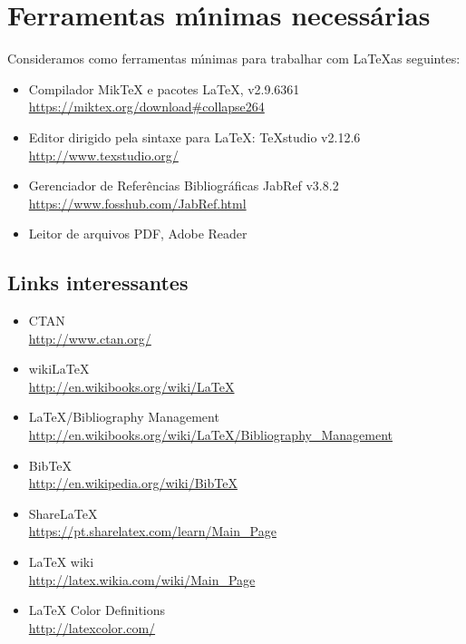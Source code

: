 \section{Ferramentas m\'{\i}nimas necess\'{a}rias}
Consideramos como ferramentas m\'{\i}nimas para trabalhar com \LaTeX as seguintes:
\begin{itemize}
	\item Compilador MikTeX e pacotes \LaTeX, v2.9.6361 \\
	\url{https://miktex.org/download#collapse264}

	\item Editor dirigido pela sintaxe para \LaTeX: TeXstudio v2.12.6\\
	\url{http://www.texstudio.org/}
	
	\item Gerenciador de Refer\^{e}ncias Bibliogr\'{a}ficas  JabRef v3.8.2 \\
	\url{https://www.fosshub.com/JabRef.html}
	
	\item Leitor de arquivos PDF, Adobe Reader\\
\end{itemize}


     \subsection{Links interessantes}
     \begin{itemize}
     	\item CTAN \\
     	\url{http://www.ctan.org/}
     	
     	\item wikiLaTeX \\
     	 \url{http://en.wikibooks.org/wiki/LaTeX}
     	
     	\item \LaTeX/Bibliography Management \\
           \url{http://en.wikibooks.org/wiki/LaTeX/Bibliography\_Management}
     	
     	\item Bib\TeX \\
     	 \url{http://en.wikipedia.org/wiki/BibTeX}
     	
     	\item ShareLaTeX \\
     	\url{https://pt.sharelatex.com/learn/Main\_Page}
     	
     	\item LaTeX wiki \\
     	\url{http://latex.wikia.com/wiki/Main\_Page}

        \item LaTeX Color Definitions \\
        \url{http://latexcolor.com/}
     	
     \end{itemize}



